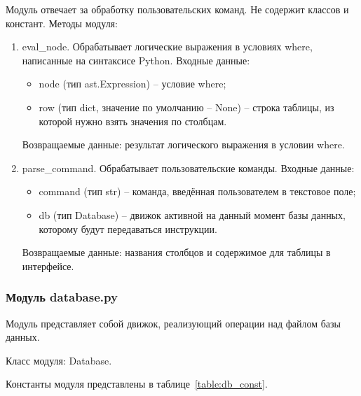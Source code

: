 Модуль отвечает за обработку пользовательских команд. Не содержит классов и констант. Методы модуля:
\begin{enumerate}
	\item eval\_node. Обрабатывает логические выражения в условиях where, написанные на синтаксисе Python. Входные данные:
	\begin{itemize}
		\item node (тип ast.Expression) -- условие where;
		\item row (тип dict, значение по умолчанию -- None) -- строка таблицы, из которой нужно взять значения по столбцам.
	\end{itemize}
	
	Возвращаемые данные: результат логического выражения в условии where.
	\item parse\_command. Обрабатывает пользовательские команды. Входные данные:
	\begin{itemize}
		\item command (тип str) -- команда, введённая пользователем в текстовое поле;
		\item db (тип Database) -- движок активной на данный момент базы данных, которому будут передаваться инструкции.
	\end{itemize}
	
	Возвращаемые данные: названия столбцов и содержимое для таблицы в интерфейсе.
\end{enumerate}

\subsubsection{Модуль database.py}

Модуль представляет собой движок, реализующий операции над файлом базы данных.

Класс модуля: Database.

Константы модуля представлены в таблице~\ref{table:db_const}.

